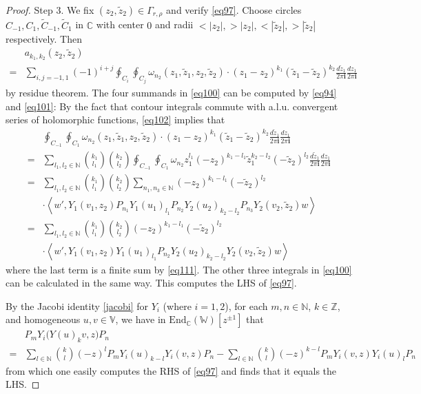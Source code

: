 \documentclass[11pt,b5paper,notitlepage]{article}
\theoremstyle{definition}
\theoremstyle{plain}
\newcommand{\wtd}{\widetilde}
\newcommand{\End}{\mathrm{End}} %
\newcommand{\im}{\mathbf{i}}
\newcommand{\Vbb}{\mathbb V}
\newcommand{\Wbb}{\mathbb W}
\newcommand{\Cbb}{\mathbb C}
\newcommand{\Nbb}{\mathbb N}
\newcommand{\Zbb}{\mathbb Z}
\newcommand{\<}{\left\langle}
\renewcommand{\>}{\right\rangle}
\numberwithin{equation}{subsection}
\begin{document}
\begin{proof}
Step 3. We fix $(z_2,\wtd z_2)\in\Gamma_{r,\rho}$ and verify \eqref{eq97}. Choose circles $C_{-1},C_1,\wtd C_{-1},\wtd C_{1}$ in $\Cbb$ with center $0$ and radii $<|z_2|,>|z_2|,<|\wtd z_2|,>|\wtd z_2|$ respectively. Then
\begin{align}
&a_{k_1,k_2}(z_2,\wtd z_2)\nonumber\\
=&\sum_{i,j=-1,1} (-1)^{i+j}\oint_{C_i}\oint_{C_j}\omega_{n_2}(z_1,\wtd z_1,z_2,\wtd z_2)\cdot (z_1-z_2)^{k_1}(\wtd z_1-\wtd z_2)^{k_2}\frac {d\wtd z_1}{2\pi\im}\frac{d z_1}{2\pi\im}  \label{eq100}
\end{align}
by residue theorem. The four summands in \eqref{eq100} can be computed by \eqref{eq94} and \eqref{eq101}: By the fact that contour integrals commute with a.l.u. convergent series of holomorphic functions, \eqref{eq102} implies that
\begin{align}
&\oint_{C_{-1}}\oint_{C_1}\omega_{n_2}(z_1,\wtd z_1,z_2,\wtd z_2)\cdot (z_1-z_2)^{k_1}(\wtd z_1-\wtd z_2)^{k_2}\frac {d\wtd z_1}{2\pi\im}\frac{d z_1}{2\pi\im}\nonumber\\
=&\sum_{l_1,l_2\in\Nbb}{k_1\choose l_1}{k_2\choose l_2}\oint_{C_{-1}}\oint_{C_1}\omega_{n_2}z_1^{l_1}(-z_2)^{k_1-l_1}\wtd z_1^{k_2-l_2}(-\wtd z_2)^{l_2}\frac{d\wtd z_1}{2\pi\im}\frac{d z_1}{2\pi\im}\nonumber\\
=&\sum_{l_1,l_2\in\Nbb}{k_1\choose l_1}{k_2\choose l_2}\sum_{n_1,n_3\in\Nbb}(-z_2)^{k_1-l_1}(-\wtd z_2)^{l_2} \nonumber\\
~~&\cdot \<w',Y_1(v_1,z_2)P_{n_1}Y_1(u_1)_{l_1}P_{n_2}Y_2(u_2)_{k_2-l_2}P_{n_3}Y_2(v_2,\wtd z_2)w\>\nonumber\\
=&\sum_{l_1,l_2\in\Nbb}{k_1\choose l_1}{k_2\choose l_2}(-z_2)^{k_1-l_1}(-\wtd z_2)^{l_2}\nonumber\\
~~&\cdot \<w',Y_1(v_1,z_2)Y_1(u_1)_{l_1}P_{n_2}Y_2(u_2)_{k_2-l_2}Y_2(v_2,\wtd z_2)w\>
\end{align}
where the last term is a finite sum by \eqref{eq111}. The other three integrals in \eqref{eq100} can be calculated in the same way. This computes the LHS of \eqref{eq97}.

By the Jacobi identity \eqref{jacobi} for $Y_i$ (where $i=1,2$), for each $m,n\in\Nbb$, $k\in\Zbb$, and homogeneous $u,v\in\Vbb$, we have in $\End_\Cbb(\Wbb)[z^{\pm1}]$ that
\begin{align*}
&P_mY_i\big(Y(u)_kv,z\big)P_n\\
=&\sum_{l\in\Nbb} {k\choose l}(-z)^lP_mY_i(u)_{k-l}Y_i(v,z)P_n-\sum_{l\in\Nbb}{k\choose l}(-z)^{k-l}P_mY_i(v,z)Y_i(u)_lP_n
\end{align*}
from which one easily computes the RHS of \eqref{eq97} and finds that it equals the LHS.
\end{proof}
\end{document}
